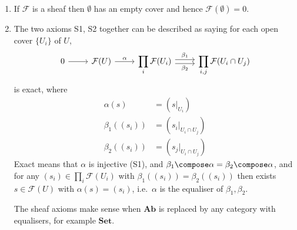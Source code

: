\documentclass[a4paper]{article}
\renewcommand{\c}[1]{\mathbf{#1}} %
\newcommand{\sh}[1]{\mathcal{#1}} %
\begin{document}
\begin{remark}\leavevmode
  \begin{enumerate}
  \item If \(\sh F\) is a sheaf then \(\emptyset\) has an empty cover and hence \(\sh F(\emptyset) = 0\).
  \item The two axioms S1, S2 together can be described as saying for each open cover \(\{U_i\}\) of \(U\),
    \[
      \begin{tikzcd}
        0 \ar[r] & \sh F(U) \ar[r, "\alpha"] & \displaystyle\prod_i \sh F(U_i) \ar[r, "\beta_1", shift left] \ar[r, "\beta_2"', shift right] & \displaystyle\prod_{i, j} \sh F(U_i \cap U_j)
      \end{tikzcd}
    \]
    is exact, where
    \begin{align*}
      \alpha(s) &= (s|_{U_i}) \\
      \beta_1((s_i)) &= (s_i|_{U_i \cap U_j}) \\
      \beta_2((s_i)) &= (s_j|_{U_i \cap U_j})
    \end{align*}
    Exact means that \(\alpha\) is injective (S1), and \(\beta_1 \compose \alpha = \beta_2 \compose \alpha\), and for any \((s_i) \in \prod_i \sh F(U_i)\) with \(\beta_1((s_i)) = \beta_2((s_i))\) then exists \(s \in \sh F(U)\) with \(\alpha(s) = (s_i)\), i.e.\ \(\alpha\) is the equaliser of \(\beta_1, \beta_2\).

    The sheaf axioms make sense when \(\c{Ab}\) is replaced by any category with equalisers, for example \(\c{Set}\).
  \end{enumerate}
\end{remark}
\end{document}
